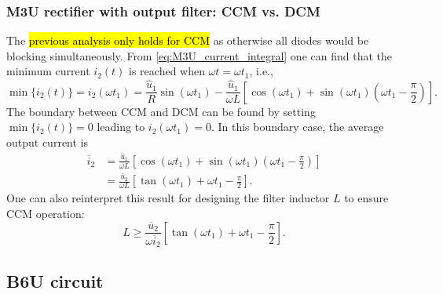 \begin{frame}
    \frametitle{M3U rectifier with output filter: CCM vs. DCM}
    The \hl{previous analysis only holds for CCM} as otherwise all diodes would be blocking simultaneously. From \eqref{eq:M3U_current_integral} one can find that the minimum current $i_2(t)$ is reached when $\omega t = \omega t_1$, i.e., 
    \begin{equation}
        \min \{i_2(t)\} = i_2(\omega t_1) = \frac{\hat{u}_1}{R}\sin(\omega t_1) - \frac{\hat{u}_1}{\omega L}\left[\cos(\omega t_1) + \sin(\omega t_1)(\omega t_1 - \frac{\pi}{2})\right].
    \end{equation}
    The boundary between CCM and DCM can be found by setting $\min \{i_2(t)\} = 0$ leading to $i_2(\omega t_1)=0$. In this boundary case, the average output current is 
    \begin{equation}
        \begin{split}
            \overline{i}_2 &= \frac{\hat{u}_1}{\omega L}\left[\cos(\omega t_1) + \sin(\omega t_1)(\omega t_1 - \frac{\pi}{2})\right]\\
                           & =  \frac{\overline{u}_2}{\omega L}\left[\tan(\omega t_1) + \omega t_1 - \frac{\pi}{2}\right].
        \end{split}
    \end{equation}
    One can also reinterpret this result for designing the filter inductor $L$ to ensure CCM operation:
    \begin{equation}
        L \geq \frac{\overline{u}_2}{\omega \overline{i}_2}\left[\tan(\omega t_1) + \omega t_1 - \frac{\pi}{2}\right].
    \end{equation}
\end{frame}

\subsection{B6U circuit} 

